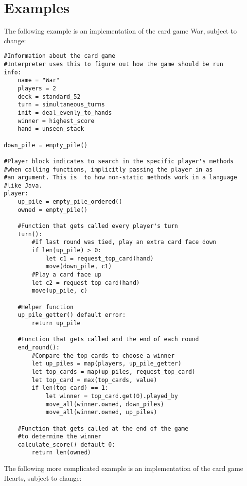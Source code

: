 \documentclass{article}
\begin{document}
\section{Examples}
The following example is an implementation of the card game War, subject to change:
\begin{lstlisting}
#Information about the card game
#Interpreter uses this to figure out how the game should be run
info:
    name = "War"
    players = 2
    deck = standard_52
    turn = simultaneous_turns
    init = deal_evenly_to_hands
    winner = highest_score
    hand = unseen_stack

down_pile = empty_pile()

#Player block indicates to search in the specific player's methods
#when calling functions, implicitly passing the player in as
#an argument. This is  to how non-static methods work in a language
#like Java.
player:
    up_pile = empty_pile_ordered()
    owned = empty_pile()

    #Function that gets called every player's turn
    turn():
        #If last round was tied, play an extra card face down
        if len(up_pile) > 0:
            let c1 = request_top_card(hand)
            move(down_pile, c1)
        #Play a card face up
        let c2 = request_top_card(hand)
        move(up_pile, c)

    #Helper function
    up_pile_getter() default error:
        return up_pile
    
    #Function that gets called and the end of each round
    end_round():
        #Compare the top cards to choose a winner
        let up_piles = map(players, up_pile_getter)
        let top_cards = map(up_piles, request_top_card)
        let top_card = max(top_cards, value)
        if len(top_card) == 1:
            let winner = top_card.get(0).played_by
            move_all(winner.owned, down_piles)
            move_all(winner.owned, up_piles)
    
    #Function that gets called at the end of the game
    #to determine the winner
    calculate_score() default 0:
        return len(owned)
\end{lstlisting}

The following more complicated example is an implementation of the card game Hearts, subject to change:
\end{document}
